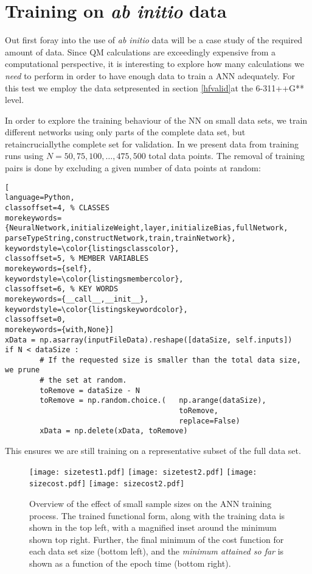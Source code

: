 \documentclass[../../master.tex]{subfiles}
\begin{document}
\newpage
\section{Training on \emph{ab initio} data \label{abinittrain}}
Out first foray into the use of \emph{ab initio} data will be a case study of the required amount of data. Since QM calculations are exceedingly expensive from a computational perspective, it is interesting to explore how many calculations we \emph{need} to perform in order to have enough data to train a ANN adequately. For this test we employ the  data set\textemdash  presented in section \ref{hfvalid}\textemdash at the 6-311++G** level. 

In order to explore the training behaviour of the NN on small data sets, we train different networks using only parts of the complete data set, but retain\textemdash crucially\textemdash the complete set for validation. In  we present data from training runs using $N=50,75,100,\dots,475,500$ total data points. The removal of training pairs is done by excluding a given number of data points at random:
\begin{lstlisting}[
language=Python,
classoffset=4, % CLASSES
morekeywords={NeuralNetwork,initializeWeight,layer,initializeBias,fullNetwork, parseTypeString,constructNetwork,train,trainNetwork},
keywordstyle=\color{listingsclasscolor},
classoffset=5, % MEMBER VARIABLES
morekeywords={self},
keywordstyle=\color{listingsmembercolor},
classoffset=6, % KEY WORDS
morekeywords={__call__,__init__},
keywordstyle=\color{listingskeywordcolor},
classoffset=0,
morekeywords={with,None}]
xData = np.asarray(inputFileData).reshape([dataSize, self.inputs])
if N < dataSize :
		# If the requested size is smaller than the total data size, we prune
		# the set at random.
		toRemove = dataSize - N
		toRemove = np.random.choice.(	np.arange(dataSize), 
										toRemove, 
										replace=False)
		xData = np.delete(xData, toRemove)
\end{lstlisting}
This ensures we are still training on a representative subset of the full data set. 

\begin{figure}
\centering
\texttt{[image: sizetest1.pdf]}
\texttt{[image: sizetest2.pdf]}
\texttt{[image: sizecost.pdf]}
\texttt{[image: sizecost2.pdf]}
\caption{Overview of the effect of small sample sizes on the ANN training process. The trained functional form, along with the training data is shown in the top left, with a magnified inset around the minimum shown top right. Further, the final minimum of the cost function for each data set size (bottom left), and the \emph{minimum attained so far} is shown as a function of the epoch time (bottom right).\label{fig:sizes}}
\end{figure}
\end{document}
